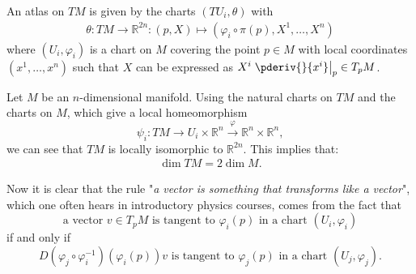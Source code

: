 

    \begin{property}
        An atlas on $TM$ is given by the charts $(TU_i,\theta)$ with
        \begin{gather}
            \theta:TM\rightarrow\mathbb{R}^{2n}:(p, X)\mapsto(\varphi_i\circ\pi(p),X^1,\ldots,X^n)
        \end{gather}
        where $(U_i, \varphi_i)$ is a chart on $M$ covering the point $p\in M$ with local coordinates $(x^1,\ldots,x^n)$ such that $X$ can be expressed as $X^i\left.\pderiv{}{x^i}\right|_p\in T_pM$.
    \end{property}

    \begin{property}[Dimension]
        Let $M$ be an $n$-dimensional manifold. Using the natural charts on $TM$ and the charts on $M$, which give a local homeomorphism \[\psi_i:TM\rightarrow U_i\times\mathbb{R}^n\xrightarrow{\varphi}\mathbb{R}^n\times\mathbb{R}^n,\] we can see that $TM$ is locally isomorphic to $\mathbb{R}^{2n}$. This implies that:
        \begin{gather}
            \dim TM = 2\dim M.
        \end{gather}
    \end{property}

    \begin{remark}
        Now it is clear that the rule "\textit{a vector is something that transforms like a vector}", which one often hears in introductory physics courses, comes from the fact that \[\text{a vector }v\in T_pM\text{ is tangent to }\varphi_i(p)\text{ in a chart }(U_i,\varphi_i)\] if and only if \[D(\varphi_j\circ\varphi_i^{-1})(\varphi_i(p))v\text{ is tangent to }\varphi_j(p)\text{ in a chart }(U_j,\varphi_j).\]
    \end{remark}

